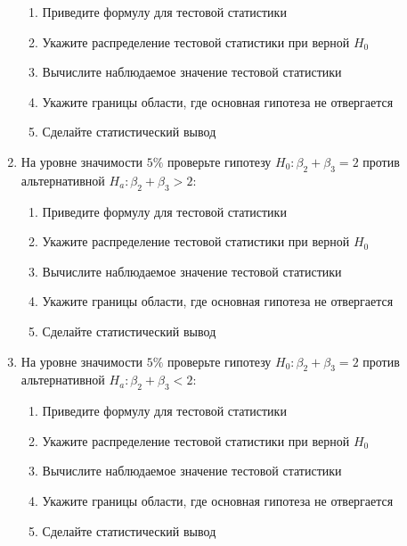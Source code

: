 \begin{problem}
\begin{enumerate}
\begin{enumerate}
\item Приведите формулу для тестовой статистики 
\item Укажите распределение тестовой статистики при верной $H_0$
\item Вычислите наблюдаемое значение тестовой статистики
\item Укажите границы области, где основная гипотеза не отвергается
\item Сделайте статистический вывод
\end{enumerate}
\item На уровне значимости $5\%$ проверьте гипотезу  $H_0: \beta_2 + \beta_3 = 2$ против альтернативной $H_a: \beta_2 + \beta_3 > 2$:
\begin{enumerate}
\item Приведите формулу для тестовой статистики 
\item Укажите распределение тестовой статистики при верной $H_0$
\item Вычислите наблюдаемое значение тестовой статистики
\item Укажите границы области, где основная гипотеза не отвергается
\item Сделайте статистический вывод
\end{enumerate}
\item На уровне значимости $5\%$ проверьте гипотезу  $H_0: \beta_2 + \beta_3 = 2$ против альтернативной $H_a: \beta_2 + \beta_3 < 2$:
\begin{enumerate}
\item Приведите формулу для тестовой статистики 
\item Укажите распределение тестовой статистики при верной $H_0$
\item Вычислите наблюдаемое значение тестовой статистики
\item Укажите границы области, где основная гипотеза не отвергается
\item Сделайте статистический вывод
\end{enumerate}
\end{enumerate}
\end{problem}

